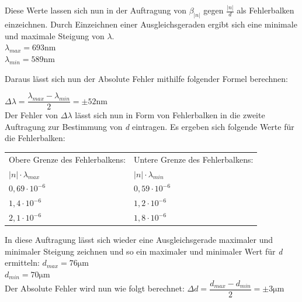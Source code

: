 \documentclass[12pt,a4paper,titlepage,headinclude,bibtotoc]{scrartcl}
\begin{document}
\begin{flushleft}
Diese Werte lassen sich nun in der Auftragung von $ \beta_{|n|} $ gegen $ \frac{|n|}{d} $ als Fehlerbalken einzeichnen. Durch Einzeichnen einer Ausgleichsgeraden ergibt sich eine minimale und maximale Steigung von $ \lambda $.\\
\vspace{0,5 cm}
$ \lambda_{max} = 693 \mathrm {nm} $\\
$ \lambda_{min} = 589 \mathrm {nm} $\\
\vspace{0,5 cm}


Daraus lässt sich nun der Absolute Fehler mithilfe folgender Formel berechnen:\\
\vspace{0,5 cm}

$ \Delta \lambda = \dfrac{ \lambda_{max}-\lambda_{min}}{2}= \pm 52 \mathrm {nm} $\\
\vspace{0,5 cm}
Der Fehler von $ \Delta \lambda $ lässt sich nun in Form von Fehlerbalken in die zweite Auftragung zur Bestimmung von \emph{d} eintragen. Es ergeben sich folgende Werte für die Fehlerbalken:
\vspace{3 cm}

\begin{table} [h]
\centering
\begin{tabular}{|p{6 cm}|p{6 cm}|}
		\hline
         Obere Grenze des Fehlerbalkens: & Untere Grenze des Fehlerbalkens: \\
         
         $ {|n|} \cdot {\lambda_{max}} $ & $ {|n|} \cdot {\lambda_{min}} $ \\
         \hline
         ${0,69} \cdot {10^{-6}} $& ${0,59} \cdot {10^{-6}} $ \\
         \hline
         ${1,4} \cdot {10^{-6}} $& ${1,2} \cdot {10^{-6}} $\\
         \hline
         ${2,1} \cdot {10^{-6}} $&${1,8} \cdot {10^{-6}} $ \\
         \hline
\end{tabular}
\end{table}
 
In diese Auftragung lässt sich wieder eine Ausgleichsgerade maximaler und minimaler Steigung zeichnen und so ein maximaler und minimaler Wert für \emph{d} ermitteln:
$ d_{max} = 76 \mathrm{\mu m} $\\
$ d_{min} = 70 \mathrm{\mu m} $\\
Der Absolute Fehler wird nun wie folgt berechnet:
$ \Delta d = \dfrac{ d_{max}-d_{min}}{2}= \pm 3 \mathrm {\mu m} $\\
\end{flushleft}
\end{document}
